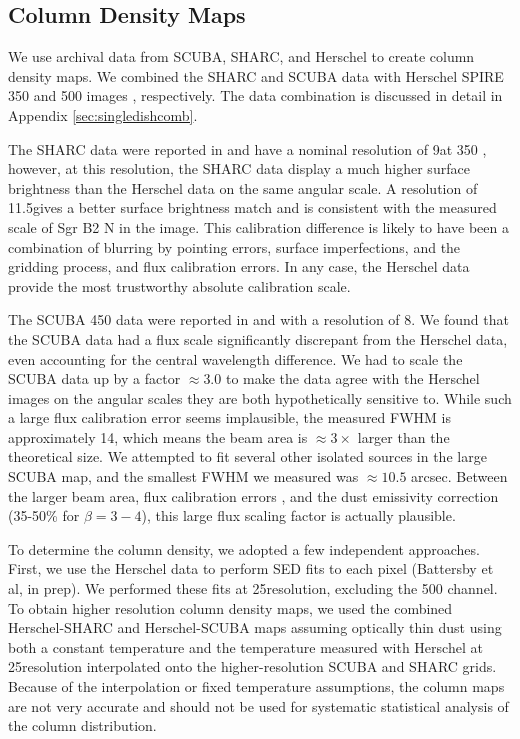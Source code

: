 \documentclass[twocolumn]{aastex61}
\newcommand{\percent}{\%\xspace}
\begin{document}
\subsection{Column Density Maps}
We use archival data from SCUBA, SHARC, and Herschel to create column density
maps.  We combined the SHARC and SCUBA data with Herschel SPIRE 350 and 500 \um
images \citep{Molinari2010a}, respectively.  The data combination is discussed
in detail in Appendix \ref{sec:singledishcomb}.  

The SHARC data were reported in \citet{Bally2010a} and have a nominal
resolution of 9\arcsec at 350 \um, however, at this resolution,
the SHARC data display a much higher surface brightness than the Herschel
data on the same angular scale.  A resolution of 11.5\arcsec gives a better
surface brightness match and is consistent with the measured scale of Sgr
B2 N in the image.  This calibration difference is likely to have been a
combination of blurring by pointing errors, surface imperfections, and
the gridding process, and flux calibration errors.  In any case, the
Herschel data provide the most trustworthy absolute calibration scale.

The SCUBA 450 \um data were reported in \citet{Pierce-Price2000a} and
\citet{di-Francesco2008a} with a resolution of 8\arcsec.  We found that the
SCUBA data had a flux scale significantly discrepant from the Herschel data,
even accounting for the central wavelength difference.  We had to scale the
SCUBA data up by a factor $\approx3.0$ to make the data agree with the Herschel
images on the angular scales they are both hypothetically sensitive to.
While such a large flux calibration error seems implausible, the measured
FWHM is approximately 14\arcsec, which means the beam area is $\approx3\times$
larger than the theoretical size.  We attempted to fit several other isolated
sources in the large SCUBA map, and the smallest FWHM we measured was $\approx10.5$
arcsec.  Between the larger beam area, flux calibration errors \citep[quoted at
20\percent in][]{Pierce-Price2000a}, and the dust emissivity correction
(35-50\percent for $\beta=3-4$), this large flux scaling factor is actually
plausible.  


To determine the column density, we adopted a few independent approaches.
First, we use the Herschel data to perform SED fits to each pixel (Battersby et
al, in prep).  We performed these fits at 25\arcsec resolution, excluding the
500 \um channel.  To obtain higher resolution column density maps, we used the
combined Herschel-SHARC and Herschel-SCUBA maps assuming optically thin dust
using both a constant temperature and the temperature measured with Herschel at
25\arcsec resolution interpolated onto the higher-resolution SCUBA and SHARC
grids.  Because of the interpolation or fixed temperature assumptions, the
column maps are not very accurate and should not be used for systematic
statistical analysis of the column distribution.
\end{document}
